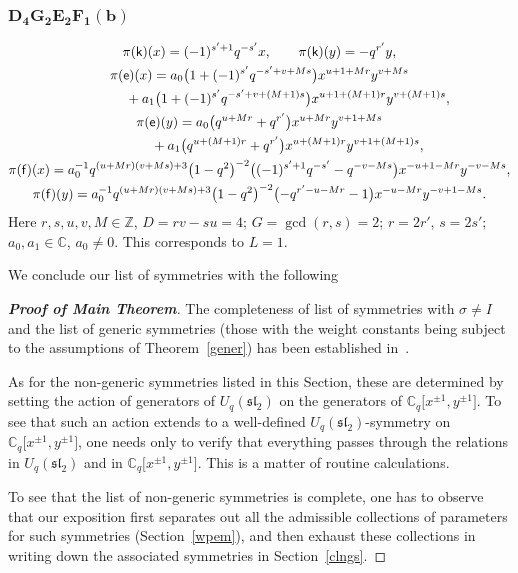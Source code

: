 \documentclass[pdftex]{sigma}
\numberwithin{equation}{section}
\begin{document}
\subsubsection*{$\boldsymbol{D_4G_2E_2F_1(b)}$}
\begin{gather*}
\pi(\mathsf{k})(x)= (-1)^{s'+1}q^{-s'}x ,\qquad\pi(\mathsf{k})(y)=-q^{r'}y ,\\
\pi(\mathsf{e})(x)= a_0\big(1+(-1)^{s'}q^{-s'+v+Ms}\big)x^{u+1+Mr}y^{v+Ms}\\
\hphantom{\pi(\mathsf{e})(x)=}{} + a_1\big(1+(-1)^{s'}q^{-s'+v+(M+1)s}\big)x^{u+1+(M+1)r}y^{v+(M+1)s} ,\\
\pi(\mathsf{e})(y)= a_0\big(q^{u+Mr}+q^{r'}\big)x^{u+Mr}y^{v+1+Ms}\\
\hphantom{\pi(\mathsf{e})(y)=}{}+ a_1\big(q^{u+(M+1)r}+q^{r'}\big)x^{u+(M+1)r}y^{v+1+(M+1)s} ,\\
 \pi(\mathsf{f})(x)= a_0^{-1}q^{(u+Mr)(v+Ms)+3}\big(1-q^2\big)^{-2}\big((-1)^{s'+1}q^{-s'}-q^{-v-Ms}\big)x^{-u+1-Mr}y^{-v-Ms} ,\\
\pi(\mathsf{f})(y)= a_0^{-1}q^{(u+Mr)(v+Ms)+3}\big(1-q^2\big)^{-2}\big({-}q^{r'-u-Mr}-1\big)x^{-u-Mr}y^{-v+1-Ms} .
\end{gather*}
Here $r,s,u,v,M\in\mathbb{Z}$, $D=rv-su=4$; $G=\operatorname{gcd}(r,s)=2$; $r=2r'$, $s=2s'$; $a_0,a_1\in\mathbb{C}$, $a_0\ne 0$. This corresponds to $L=1$.

We conclude our list of symmetries with the following

\begin{proof}[\bf Proof of Main Theorem] The completeness of list of symmetries with $\sigma\ne I$ and the list of generic symmetries (those with the weight constants being subject to the assumptions of Theorem~\ref{gener}) has been established in~\cite{S}.

As for the non-generic symmetries listed in this Section, these are determined by setting the action of generators of $U_q(\mathfrak{sl}_2)$ on the generators of $\mathbb{C}_q\big[x^{\pm 1},y^{\pm 1}\big]$. To see that such an action extends to a well-defined $U_q(\mathfrak{sl}_2)$-symmetry on $\mathbb{C}_q\big[x^{\pm 1},y^{\pm 1}\big]$, one needs only to verify that everything passes through the relations in $U_q(\mathfrak{sl}_2)$ and in $\mathbb{C}_q\big[x^{\pm 1},y^{\pm 1}\big]$. This is a matter of routine calculations.

To see that the list of non-generic symmetries is complete, one has to observe that our exposition first separates out all the admissible collections of parameters for such symmetries (Section~\ref{wpem}), and then exhaust these collections in writing down the associated symmetries in Section~\ref{clngs}.
\end{proof}
\end{document}
